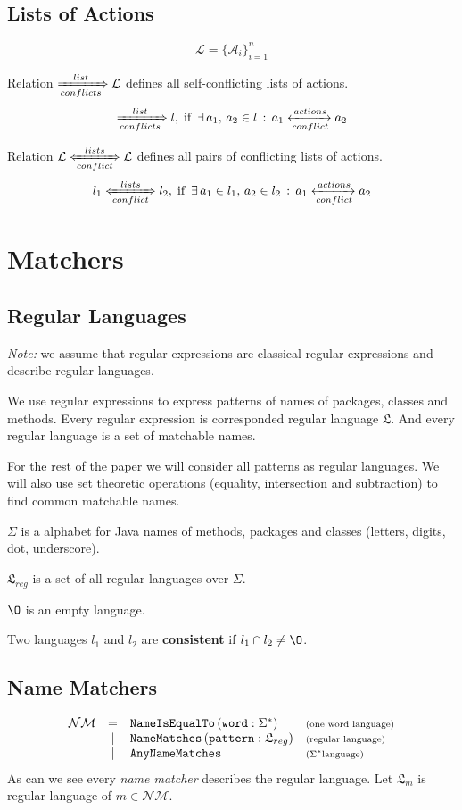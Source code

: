 \documentclass{article}
\newcommand{\cActions}{\xleftrightarrow[conflict]{actions}}
\newcommand{\cList}{\xRightarrow[conflicts]{list}}
\newcommand{\cLists}{\xLeftrightarrow[conflict]{lists}}
\newcommand{\lang}{\mathfrak{L}}
\newcommand{\regL}{\lang_{reg}}
\newcommand{\fullL}{$\Sigma^*$}
\newcommand{\descr}[1]{\mbox{\scriptsize ({#1})}}
\begin{document}
\subsection{Lists of Actions}

\[\mathcal{L} = \{\mathcal{A}_i\}_{i=1}^{n}\]

\noindent Relation $\cList \mathcal{L}$ defines all self-conflicting lists of actions.
\[
\cList l,\; \mbox{if }\, \exists\, a_1,\, a_2 \in l\, : \, a_1 \cActions a_2
\]

\noindent Relation $\mathcal{L} \cLists \mathcal{L}$ defines all pairs of conflicting lists of actions.
\[
l_1 \cLists l_2,\; \mbox{if }\, \exists\, a_1 \in l_1,\, a_2 \in l_2\, : \, a_1 \cActions a_2
\]


\section{Matchers}
\subsection{Regular Languages}

\textit{Note:} we assume that regular expressions are classical regular expressions and describe regular languages.

We use regular expressions to express patterns of names of packages, classes and methods. Every regular expression is corresponded regular language $\lang$. And every regular language is a set of matchable names.

For the rest of the paper we will consider all patterns as regular languages. We will also use set theoretic operations (equality, intersection and subtraction) to find common matchable names.

$\Sigma$ is a alphabet for Java names of methods, packages and classes (letters, digits, dot, underscore).

$\regL$ is a set of all regular languages over $\Sigma$.

$\O$ is an empty language.

Two languages $l_1$ and $l_2$ are \textbf{consistent} if $l_1 \cap l_2 \not= \O$.

\subsection{Name Matchers}

\[
\begin{array}{rcll}
\mathcal{NM} & =    & \texttt{NameIsEqualTo}\,(\texttt{word} : \Sigma^*) & \descr{one word language} \\
             & \mid & \texttt{NameMatches}\,(\texttt{pattern} : \regL) & \descr{regular language} \\
             & \mid & \texttt{AnyNameMatches} & \descr{\fullL language}
\end{array}
\]
\noindent As can we see every \textit{name matcher} describes the regular language. Let $\lang_m$ is regular language of $m \in \mathcal{NM}$.
\end{document}
